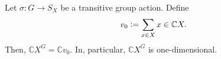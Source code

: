 




\begin{prop} \label{prop:fixedspacetransaction}
	Let $\sigma : G \to S_X$ be a transitive group action. Define
	\begin{equation*} 
		v_0 \vcentcolon= \sum_{x \in X} x \in \mathbb{C}X.
	\end{equation*}
	Then, $\mathbb{C}X^G = \mathbb{C}v_0.$ In, particular, $\mathbb{C}X^G$ is one-dimensional.
\end{prop}

